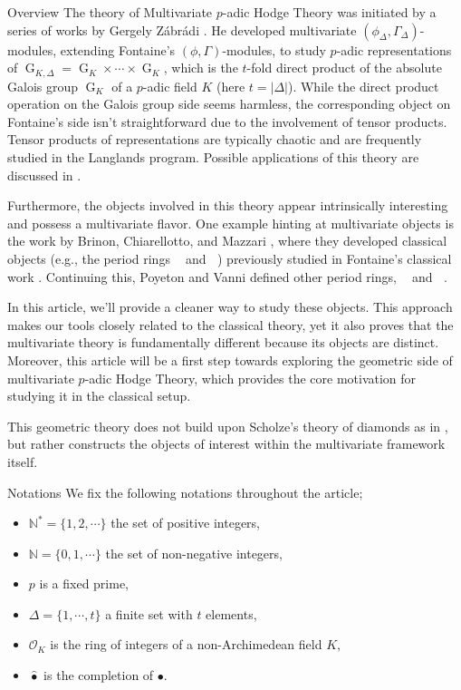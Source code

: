 \documentclass[12pts,a4paper]{amsart}
\DeclareMathOperator{\G}{G}
\DeclareMathOperator{\Bdr}{B_{dR,\Delta}}
\DeclareMathOperator{\BHT}{B_{HT,\Delta}}
\DeclareMathOperator{\Bcris}{B_{cris,\Delta}}
\DeclareMathOperator{\Bst}{B_{st,\Delta}}
\begin{document}
\begin{subsection}{Overview}
   The theory of Multivariate $p$-adic Hodge Theory was initiated by a series of works by Gergely Zábrádi \cite{Zab,Zab2}. He developed multivariate $(\phi_\Delta,\Gamma_\Delta)$-modules, extending Fontaine's $(\phi,\Gamma)$-modules, to study $p$-adic representations of $\G_{K,\Delta}=\G_K\times\cdots\times \G_K$, which is the $t$-fold direct product of the absolute Galois group $\G_K$ of a $p$-adic field $K$ (here $t=|\Delta|$). While the direct product operation on the Galois group side seems harmless, the corresponding object on Fontaine's side isn't straightforward due to the involvement of tensor products. Tensor products of representations are typically chaotic and are frequently studied in the Langlands program. Possible applications of this theory are discussed in \cite{Pal-Zab,CarKedZab}.

  Furthermore, the objects involved in this theory appear intrinsically interesting and possess a multivariate flavor. One example hinting at multivariate objects is the work by Brinon, Chiarellotto, and Mazzari \cite{Bri}, where they developed classical objects (e.g., the period rings $\Bdr$ and $\BHT$) previously studied in Fontaine's classical work \cite{Fontaine}. Continuing this, Poyeton and Vanni \cite{poyeton} defined other period rings, $\Bcris$ and $\Bst$.

  In this article, we'll provide a cleaner way to study these objects. This approach makes our tools closely related to the classical theory, yet it also proves that the multivariate theory is fundamentally different because its objects are distinct. Moreover, this article will be a first step towards exploring the geometric side of multivariate $p$-adic Hodge Theory, which provides the core motivation for studying it in the classical setup.

  This geometric theory does not build upon Scholze's theory of diamonds as in \cite{CarKedZab}, but rather constructs the objects of interest within the multivariate framework itself.
\end{subsection}

\begin{subsection}{Notations}
    We fix the following notations throughout the article;
    \begin{itemize}
        \item $\mathbb{N}^*=\{1,2,\cdots\}$ the set of positive integers,
        \item $\mathbb{N}=\{0,1,\cdots\}$ the set of non-negative integers,
        \item $p$ is a fixed prime,
        \item $\Delta=\{1,\cdots,t\}$ a finite set with $t$ elements,
        \item $\mathcal{O}_K$ is the ring of integers of a non-Archimedean field $K$,
        \item $\hat{\bullet}$ is the completion of $\bullet$.
    \end{itemize}
\end{subsection}
\end{document}
